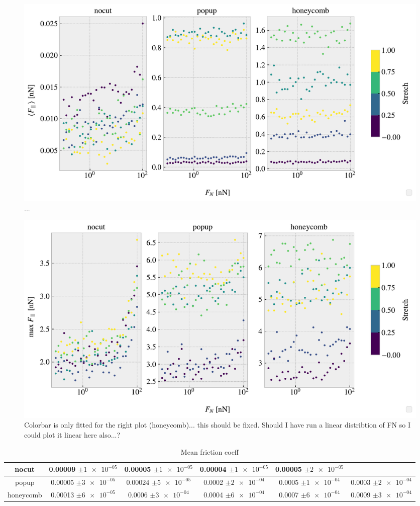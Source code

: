 \begin{figure}[H]
  \centering
  \includegraphics[width=\linewidth]{figures/baseline/multi_FN_mean_compare.pdf}
  \caption{...}
  \label{fig:}
\end{figure}


\begin{figure}[H]
  \centering
  \includegraphics[width=\linewidth]{figures/baseline/multi_FN_max_compare.pdf}
  \caption{Colorbar is only fitted for the right plot (honeycomb)... this should be fixed. Should I have run a linear distribtion of FN so I could plot it linear here also...?}
  \label{fig:}
\end{figure}



\begin{table}[H]
  \begin{center}
  \caption{Mean friction coeff}
  \label{tab:fric_coeff}
  \begin{tabular}{| c | c | c | c | c | c |} \hline
    nocut & 0.00009 $\pm\num{1e-05}$ & 0.00005 $\pm\num{1e-05}$ & 0.00004 $\pm\num{1e-05}$ & 0.00005 $\pm\num{2e-05}$ & \\ \hline
    popup & 0.00005 $\pm\num{3e-05}$ & 0.00024 $\pm\num{5e-05}$ & 0.0002 $\pm\num{2e-04}$ & 0.0005 $\pm\num{1e-04}$ & 0.0003 $\pm\num{2e-04}$ \\ \hline
    honeycomb & 0.00013 $\pm\num{6e-05}$ & 0.0006 $\pm\num{3e-04}$ & 0.0004 $\pm\num{6e-04}$ & 0.0007 $\pm\num{6e-04}$ & 0.0009 $\pm\num{3e-04}$ \\ \hline
  \end{tabular}
  \end{center}
\end{table}

